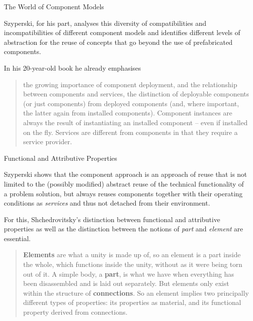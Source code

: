 \documentclass{beamer}
\begin{document}
\begin{frame}{The World of Component Models}

Szyperski, for his part, analyses this diversity of compatibilities and
incompatibilities of different component models and identifies different
levels of abstraction for the reuse of concepts that go beyond the use of
prefabricated components.

In his 20-year-old book he already emphasises
\begin{quote}\small
  the growing importance of component deployment, and the relationship between
  components and services, the distinction of deployable components (or just
  components) from deployed components (and, where important, the latter again
  from installed components). Component instances are always the result of
  instantiating an installed component -- even if installed on the fly.
  Services are different from components in that they require a service
  provider.  
\end{quote}
  
\end{frame}

\begin{frame}{Functional and Attributive Properties}

Szyperski shows that the component approach is an approach of reuse that is
not limited to the (possibly modified) abstract reuse of the technical
functionality of a problem solution, but always reuses components together
with their operating conditions as \emph{services} and thus not detached from
their environment.

For this, Shchedrovitsky's distinction between functional and attributive
properties as well as the distinction between the notions of \emph{part} and
\emph{element} are essential.  
\begin{quote}\small
  {\bf Elements} are what a unity is made up of, so an element is a part
  inside the whole, which functions inside the unity, without as it were being
  torn out of it. A simple body, a {\bf part}, is what we have when everything
  has been disassembled and is laid out separately. But elements only exist
  within the structure of {\bf connections}. So an element implies two
  principally different types of properties: its properties as material, and
  its functional property derived from connections.
\end{quote}
\end{frame}
\end{document}
